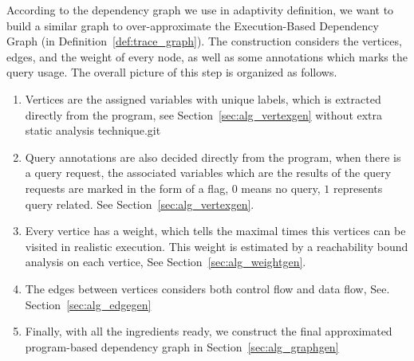 According to the dependency graph we use in adaptivity definition, we want to build a similar graph to {over-}approximate the
Execution-Based Dependency Graph (in Definition~\ref{def:trace_graph}). The construction considers the vertices, edges, and the weight of every node, as well as some annotations which marks the query usage. The overall picture of this step is organized as follows.


\begin{enumerate}
\item  Vertices are the assigned variables with unique labels, which is extracted directly from the program, see Section~\ref{sec:alg_vertexgen}
without extra static analysis technique.git 
\item Query annotations are also decided directly from the program, when there is a query request, the associated variables which are the results of the query requests are marked in the form of a flag, $0$ means no query, $1$ represents query related. See Section~\ref{sec:alg_vertexgen}.
\item Every vertice has a weight, which tells the maximal times this vertices can be visited in realistic execution. This weight is estimated by a reachability bound analysis on each vertice, See Section~\ref{sec:alg_weightgen}.
\item The edges between vertices considers both control flow and data flow, See.
Section~\ref{sec:alg_edgegen}
\item  Finally, with all the ingredients ready, we construct the final approximated program-based dependency graph in Section~\ref{sec:alg_graphgen}
\end{enumerate}


